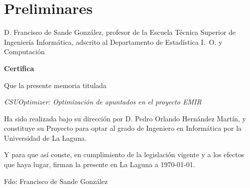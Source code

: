 \chapter*{Preliminares}
\thispagestyle{empty}
D. Francisco de Sande González, profesor de la Escuela Técnica Superior de Ingeniería Informática,
adscrito al Departamento de Estadística I.~O. y Computación

\vspace*{2cm}

{\bf Certifica} \\
\vspace*{1cm}

Que la presente memoria titulada

\textit{CSUOptimizer: Optimización de apuntados en el proyecto EMIR}

Ha sido realizada bajo su dirección por D. Pedro Orlando Hernández Martín, y 
constituye su Proyecto para optar al grado de Ingeniero en Informática por la
Universidad de La Laguna.

Y para que así conste, en cumplimiento de la legislación vigente y a los efectos
que haya lugar, firman la presente en La Laguna a \today. 


\vspace*{5cm}
Fdo: Francisco de Sande González

